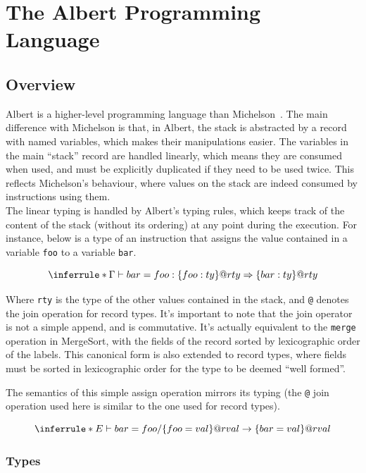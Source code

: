 \documentclass{report}
\begin{document}
\chapter{The Albert Programming Language}

\section{Overview}

Albert is a higher-level programming language than Michelson~\cite{albertProposal}. The main difference with Michelson is that, in Albert, the stack is abstracted by a record with named variables, which makes their manipulations easier. The variables in the main ``stack'' record are handled linearly, which means they are consumed when used, and must be explicitly duplicated if they need to be used twice. This reflects Michelson's behaviour, where values on the stack are indeed consumed by instructions using them.\\

The linear typing is handled by Albert's typing rules, which keeps track of the content of the stack (without its ordering) at any point during the execution. For instance, below is a type of an instruction that assigns the value contained in a variable \texttt{foo} to a variable \texttt{bar}.

$$
\inferrule*
    { }
    { \Gamma \vdash bar = foo : \{ foo : ty \} @ rty \Rightarrow \{ bar : ty \} @ rty }
$$

    Where \texttt{rty} is the type of the other values contained in the stack, and \texttt{@} denotes the join operation for record types. It's important to note that the join operator is not a simple append, and is commutative. It's actually equivalent to the \texttt{merge} operation in MergeSort, with the fields of the record sorted by lexicographic order of the labels. This canonical form is also extended to record types, where fields must be sorted in lexicographic order for the type to be deemed ``well formed''.

The semantics of this simple assign operation mirrors its typing (the \texttt{@} join operation used here is similar to the one used for record types).

$$
\inferrule*
    { }
    { E \vdash bar = foo / \{ foo = val \} @ rval \rightarrow \{ bar = val \} @ rval }
    $$

\subsection{Types}
\end{document}

